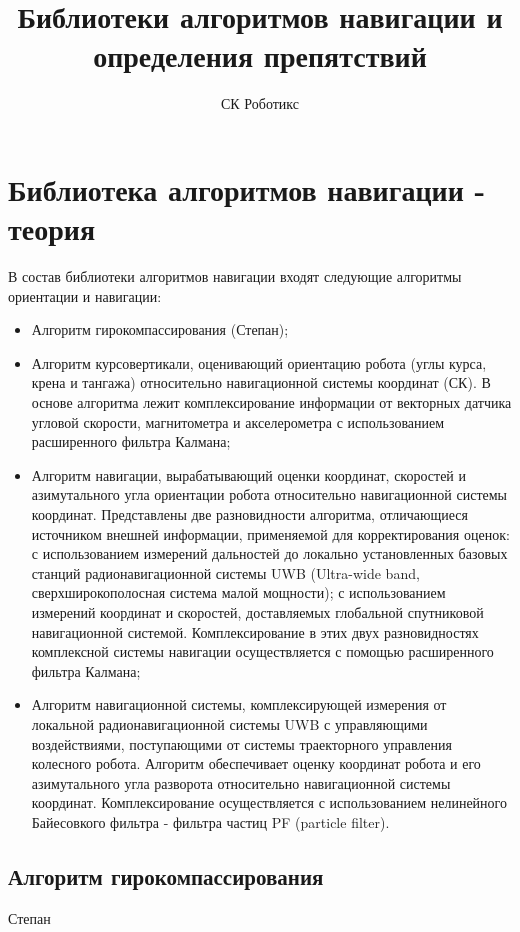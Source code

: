 \documentclass[14pt]{article}
\title{Библиотеки алгоритмов навигации и определения препятствий}
\author{СК Роботикс }
\begin{document}
\maketitle

\section{Библиотека алгоритмов навигации - теория}

В состав библиотеки алгоритмов навигации входят следующие алгоритмы ориентации и навигации:

\begin{itemize}
    \item Алгоритм гирокомпассирования (Степан);
    \item Алгоритм курсовертикали, оценивающий ориентацию робота (углы курса, крена и тангажа) относительно навигационной системы координат (СК). В основе алгоритма лежит комплексирование информации от векторных датчика угловой скорости, магнитометра и акселерометра с использованием расширенного фильтра Калмана;
    \item Алгоритм навигации, вырабатывающий оценки координат, скоростей и азимутального угла ориентации робота относительно навигационной системы координат. Представлены две разновидности алгоритма, отличающиеся источником внешней информации, применяемой для корректирования оценок: с использованием измерений дальностей до локально установленных базовых станций радионавигационной системы UWB (Ultra-wide band, сверхширокополосная система малой мощности); с использованием измерений координат и скоростей, доставляемых глобальной спутниковой навигационной системой. Комплексирование в этих двух разновидностях комплексной системы навигации осуществляется с помощью расширенного фильтра Калмана;
     \item Алгоритм навигационной системы, комплексирующей измерения от локальной радионавигационной системы UWB с управляющими воздействиями, поступающими от системы траекторного управления колесного робота. Алгоритм обеспечивает оценку координат робота и его азимутального угла разворота относительно навигационной системы координат. Комплексирование  осуществляется с использованием нелинейного Байесовкого фильтра - фильтра частиц PF (particle filter).
\end{itemize} 

\subsection{Алгоритм гирокомпассирования}
Степан
\end{document}
